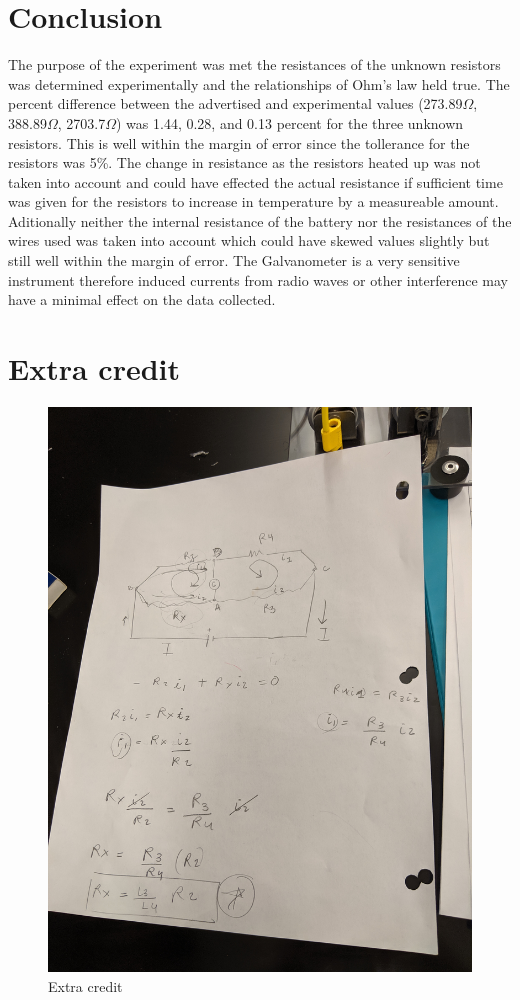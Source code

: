 \documentclass[12pt letterpaper]{article}
\begin{document}
\section*{Conclusion}
The purpose of the experiment was met the resistances of the unknown resistors was determined experimentally and the relationships of Ohm's law held true. The percent difference between the advertised and experimental values (273.89\(\Omega\), 388.89\(\Omega\), 2703.7\(\Omega\)) was 1.44, 0.28, and 0.13 percent for the three unknown resistors. This is well within the margin of error since the tollerance for the resistors was 5\%. The change in resistance as the resistors heated up was not taken into account and could have effected the actual resistance if sufficient time was given for the resistors to increase in temperature by a measureable amount. Aditionally neither the internal resistance of the battery nor the resistances of the wires used was taken into account which could have skewed values slightly but still well within the margin of error. The Galvanometer is a very sensitive instrument therefore induced currents from radio waves or other interference may have a minimal effect on the data collected.

\section*{Extra credit}

\begin{figure}[H]
    \centering
    \includegraphics[width=\textwidth]{Extracredit}
    \caption{Extra credit}
    \label{fig:Extra credit}
\end{figure}
\end{document}
